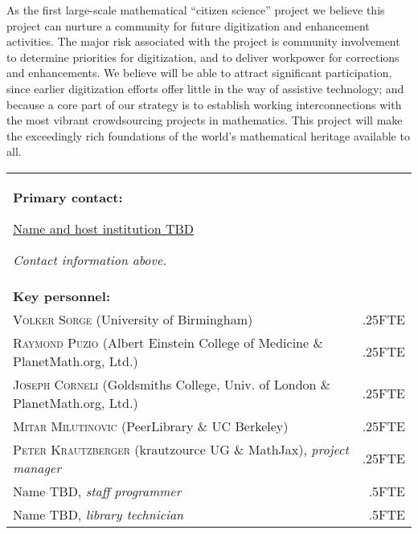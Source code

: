 \documentclass[10pt,letterpaper]{article}
\begin{document}
As the first large-scale mathematical ``citizen science'' project we
believe this project can nurture a community for future digitization
and enhancement activities.  The major risk associated with the
project is community involvement to determine priorities for
digitization, and to deliver workpower for corrections and
enhancements.  We believe will be able to attract significant
participation, since earlier digitization efforts offer little in the
way of assistive technology; and because a core part of our strategy
is to establish working interconnections with the most vibrant
crowdsourcing projects in mathematics.  This project will make the
exceedingly rich foundations of the world's mathematical heritage
available to all.


\bigskip

\begin{tabular}{p{}r}
\textbf{Primary contact:} \par
\ul{Name and host institution TBD}
\par \emph{Contact information above.} &  \\[1cm]
\textbf{Key personnel:} &\\
\textsc{Volker Sorge} (University of Birmingham) &.25FTE \\
\textsc{Raymond Puzio} (Albert Einstein College of Medicine \& PlanetMath.org, Ltd.) & .25FTE \\
\textsc{Joseph Corneli} (Goldsmiths College, Univ. of London \& PlanetMath.org, Ltd.) &.25FTE \\
\textsc{Mitar Milutinovic} (PeerLibrary \& UC Berkeley)  &.25FTE \\
\textsc{Peter Krautzberger} (krautzource UG \& MathJax), \emph{project manager}&.25FTE\\
Name TBD, \emph{staff programmer}   &.5FTE \\
Name TBD, \emph{library technician}  &.5FTE \\
\end{tabular}
\end{document}
